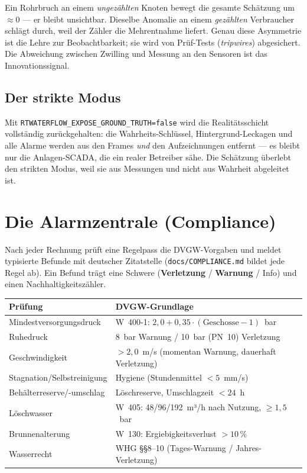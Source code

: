 \documentclass[11pt,a4paper,parskip=half]{scrreprt}
\newcommand{\file}[1]{\texttt{#1}}              %
\begin{document}
\begin{beispiel}
Ein Rohrbruch an einem \emph{ungezählten} Knoten bewegt die gesamte Schätzung um
$\approx0$ — er bleibt unsichtbar. Dieselbe Anomalie an einem \emph{gezählten}
Verbraucher schlägt durch, weil der Zähler die Mehrentnahme liefert. Genau diese
Asymmetrie ist die Lehre zur Beobachtbarkeit; sie wird von Prüf-Tests
(\emph{tripwires}) abgesichert. Die Abweichung zwischen Zwilling und Messung an
den Sensoren ist das Innovationssignal.
\end{beispiel}

\section{Der strikte Modus}

Mit \texttt{RTWATERFLOW\_EXPOSE\_GROUND\_TRUTH=false} wird die Realitätsschicht
vollständig zurückgehalten: die Wahrheits-Schlüssel, Hintergrund-Leckagen und alle
Alarme werden aus den Frames \emph{und} den Aufzeichnungen entfernt — es bleibt
nur die Anlagen-SCADA, die ein realer Betreiber sähe. Die Schätzung überlebt den
strikten Modus, weil sie aus Messungen und nicht aus Wahrheit abgeleitet ist.

\chapter{Die Alarmzentrale (Compliance)}
\label{ch:alarm}

Nach jeder Rechnung prüft eine Regelpass die DVGW-Vorgaben und meldet typisierte
Befunde mit deutscher Zitatstelle (\file{docs/COMPLIANCE.md} bildet jede Regel
ab). Ein Befund trägt eine Schwere (\textcolor{rot}{\textbf{Verletzung}} /
\textcolor{amber}{\textbf{Warnung}} / Info) und einen Nachhaltigkeitszähler.

\begin{center}
\small
\begin{tabularx}{\linewidth}{@{}lX@{}}
\toprule
Prüfung & DVGW-Grundlage \\
\midrule
Mindestversorgungsdruck & W~400-1: $2{,}0 + 0{,}35\cdot(\text{Geschosse}-1)$~bar \\
Ruhedruck & 8~bar Warnung / 10~bar (PN~10) Verletzung \\
Geschwindigkeit & $>2{,}0$~m/s (momentan Warnung, dauerhaft Verletzung) \\
Stagnation/Selbstreinigung & Hygiene (Stundenmittel $<5$~mm/s) \\
Behälterreserve/-umschlag & Löschreserve, Umschlagzeit $<24$~h \\
Löschwasser & W~405: 48/96/192~m³/h nach Nutzung, $\geq1{,}5$~bar \\
Brunnenalterung & W~130: Ergiebigkeitsverlust $>10\,\%$ \\
Wasserrecht & WHG §§8--10 (Tages-Warnung / Jahres-Verletzung) \\
\bottomrule
\end{tabularx}
\end{center}
\end{document}
